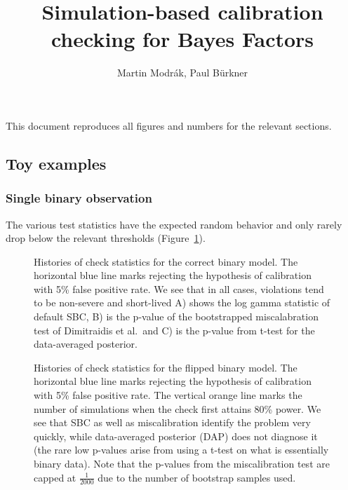 \documentclass[
  letterpaper,
  DIV=11,
  numbers=noendperiod]{scrartcl}
\title{Simulation-based calibration checking for Bayes Factors}
\author{Martin Modrák, Paul Bürkner}
\date{}
\begin{document}
\maketitle


This document reproduces all figures and numbers for the relevant
sections.

\subsection{Toy examples}\label{toy-examples}

\subsubsection{Single binary
observation}\label{single-binary-observation}

The various test statistics have the expected random behavior and only
rarely drop below the relevant thresholds
(Figure~\ref{fig-binary-correct}).

\begin{figure}


\caption{\label{fig-binary-correct}Histories of check statistics for the
correct binary model. The horizontal blue line marks rejecting the
hypothesis of calibration with 5\% false positive rate. We see that in
all cases, violations tend to be non-severe and short-lived A) shows the
log gamma statistic of default SBC, B) is the p-value of the
bootstrapped miscalabration test of Dimitraidis et al.~and C) is the
p-value from t-test for the data-averaged posterior.}

\end{figure}%

\begin{figure}


\caption{\label{fig-binary-flipped}Histories of check statistics for the
flipped binary model. The horizontal blue line marks rejecting the
hypothesis of calibration with 5\% false positive rate. The vertical
orange line marks the number of simulations when the check first attains
80\% power. We see that SBC as well as miscalibration identify the
problem very quickly, while data-averaged posterior (DAP) does not
diagnose it (the rare low p-values arise from using a t-test on what is
essentially binary data). Note that the p-values from the miscalibration
test are capped at \(\frac{1}{2000}\) due to the number of bootstrap
samples used.}

\end{figure}%
\end{document}
